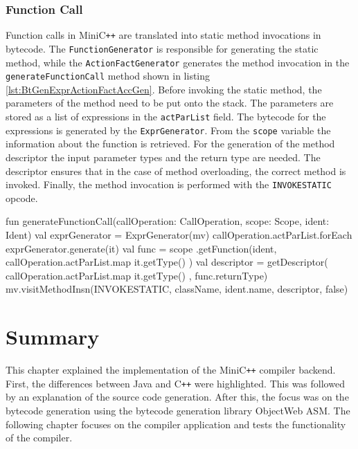 \subsubsection{Function Call}

Function calls in MiniC\verb|++| are translated into static method invocations in bytecode. The \verb|FunctionGenerator| is responsible for generating the static method, while the \verb|ActionFactGenerator| generates the method invocation in the \verb|generateFunctionCall| method shown in listing \ref{lst:BtGenExprActionFactAccGen}. Before invoking the static method, the parameters of the method need to be put onto the stack. The parameters are stored as a list of expressions in the \verb|actParList| field. The bytecode for the expressions is generated by the \verb|ExprGenerator|. From the \verb|scope| variable the information about the function is retrieved. For the generation of the method descriptor the input parameter types and the return type are needed. The descriptor ensures that in the case of method overloading, the correct method is invoked. Finally, the method invocation is performed with the \verb|INVOKESTATIC| opcode. 

\begin{KotlinCode}[float,numbers=none,caption=Implementation of the \texttt{generateFunctionCall} method of the \texttt{ActionFactGenerator}., label=lst:BtGenExprActionFactAccGen]
fun generateFunctionCall(callOperation: CallOperation, scope: Scope, ident: Ident) {
    val exprGenerator = ExprGenerator(mv)
    callOperation.actParList.forEach {
        exprGenerator.generate(it)
    }
    val func = scope
    .getFunction(ident, callOperation.actParList.map { it.getType() })
    val descriptor = getDescriptor(
        callOperation.actParList.map { it.getType() }, func.returnType)
    mv.visitMethodInsn(INVOKESTATIC, className, ident.name, descriptor, false)
}

\end{KotlinCode}

\section{Summary}

This chapter explained the implementation of the MiniC\verb|++| compiler backend. First, the differences between Java and C\verb|++| were highlighted. This was followed by an explanation of the source code generation. After this, the focus was on the bytecode generation using the bytecode generation library ObjectWeb ASM. The following chapter focuses on the compiler application and tests the functionality of the compiler.

